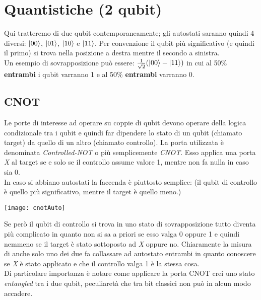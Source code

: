 \section{Quantistiche (2 qubit)}
Qui tratteremo di due qubit contemporaneamente; gli autostati saranno quindi 4 diversi: $\ket{00}$, $\ket{01}$, $\ket{10}$ e $\ket{11}$. Per convenzione il qubit più significativo (e quindi il primo) si trova nella posizione a destra mentre il secondo a sinistra.\\
Un esempio di sovrapposizione può essere: $\frac{1}{\sqrt{2}}(\ket{00} -\ket{11})$ in cui al 50\% \textbf{entrambi} i qubit varranno 1 e al 50\% \textbf{entrambi} varranno 0. 
\subsection{CNOT}
Le porte di interesse ad operare su coppie di qubit devono operare della logica condizionale tra i qubit e quindi far dipendere lo stato di un qubit (chiamato target) da quello di un altro (chiamato controllo). La porta utilizzata è denominata \textit{Controlled-NOT} o più semplicemente \textit{CNOT}. Esso applica una porta \textit{X} al target se e solo se il controllo assume valore 1, mentre non fa nulla in caso sia 0.\\
In caso si abbiano autostati la faccenda è piuttosto semplice: (il qubit di controllo è quello più significativo, mentre il target è quello meno.)
\begin{center}
\texttt{[image: cnotAuto]}
\end{center}
Se però il qubit di controllo si trova in uno stato di sovrapposizione tutto diventa più complicato in quanto non si sa a priori se esso valga 0 oppure 1 e quindi nemmeno se il target è stato sottoposto ad \textit{X} oppure no. Chiaramente la misura di anche solo uno dei due fa collassare ad autostato entrambi in quanto conoscere se \textit{X} è stato applicato e che il controllo valga 1 è la stessa cosa.\\
Di particolare importanza è notare come applicare la porta CNOT crei uno stato \textit{entangled} tra i due qubit, peculiaretà che tra bit classici non può in alcun modo accadere.